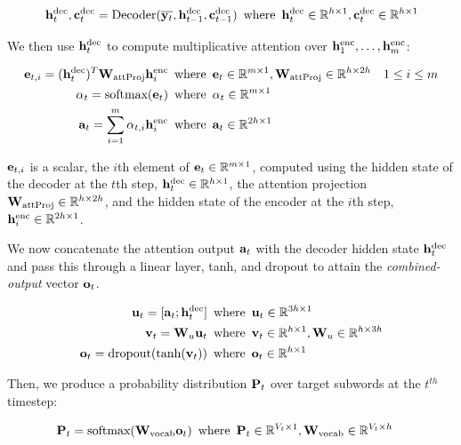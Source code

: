 \begin{align}
    \mathbf{h}^{\text{dec}}_t, \mathbf{c}^{\text{dec}}_t = \text{Decoder}(\overline{\mathbf{y}_t}, \mathbf{h}^{\text{dec}}_{t-1}, \mathbf{c}^{\text{dec}}_{t-1}) \enspace &\text{where} \enspace \mathbf{h}^{\text{dec}}_t \in \mathbb{R}^{h \times 1}, \mathbf{c}^{\text{dec}}_t \in \mathbb{R}^{h \times 1}\\
\end{align}

We then use $\mathbf{h}^{\text{dec}}_t$ to compute multiplicative attention over $\mathbf{h}^{\text{enc}}_1, \dots, \mathbf{h}^{\text{enc}}_m$:

\begin{align}
    \mathbf{e}_{t, i} = (\mathbf{h}^{\text{dec}}_t)^T\mathbf{W}_{\text{attProj}}\mathbf{h}^{\text{enc}}_i \enspace &\text{where} \enspace \mathbf{e}_{t} \in \mathbb{R}^{m \times 1}, \mathbf{W}_{\text{attProj}}\in \mathbb{R}^{h \times 2h} & 1 \le i \le m \\
    \alpha_t= \text{softmax}(\mathbf{e}_t) \enspace &\text{where} \enspace \alpha_t \in \mathbb{R}^{m \times 1}\\
    \mathbf{a}_t = \sum_{i=1}^{m}\alpha_{t,i}\mathbf{h}^{\text{enc}}_i \enspace &\text{where} \enspace \mathbf{a}_t \in \mathbb{R}^{2h \times 1}
\end{align}

$\mathbf{e}_{t, i}$ is a scalar, the $i$th element of $\mathbf{e}_{t} \in \mathbb{R}^{m \times 1}$, computed using the hidden state of the decoder at the $t$th step, $\mathbf{h}^{\text{dec}}_t \in \mathbb{R}^{h \times 1}$, the attention projection $\mathbf{W}_{\text{attProj}} \in \mathbb{R}^{h \times 2h}$, and the hidden state of the encoder at the $i$th step, $\mathbf{h}^{\text{enc}}_i \in \mathbb{R}^{2h \times 1}$.

We now concatenate the attention output $\mathbf{a}_t$ with the decoder hidden state $\mathbf{h}^{\text{dec}}_t$ and pass this through a linear layer, tanh, and dropout to attain the \textit{combined-output} vector $\mathbf{o}_{t}$.

\begin{align}
    \mathbf{u}_{t} = [\mathbf{a}_{t}; \mathbf{h}^{\text{dec}}_t] \enspace &\text{where} \enspace \mathbf{u}_t \in  \mathbb{R}^{3h \times 1} \\
    \mathbf{v}_t = \mathbf{W}_{u}\mathbf{u}_t \enspace &\text{where} \enspace \mathbf{v}_t \in \mathbb{R}^{h \times 1}, \mathbf{W}_{u} \in \mathbb{R}^{h \times 3h}\\
    \mathbf{o}_t = \text{dropout}(\text{tanh}(\mathbf{v}_t)) \enspace &\text{where} \enspace \mathbf{o}_t \in \mathbb{R}^{h \times 1}
\end{align}

Then, we produce a probability distribution $\mathbf{P}_t$ over target subwords at the $t^{th}$ timestep:

\begin{align}
    \mathbf{P}_t = \text{softmax}(\mathbf{W}_{\text{vocab}}\mathbf{o}_{t}) \enspace &\text{where} \enspace \mathbf{P}_t \in \mathbb{R}^{V_{t} \times 1}, \mathbf{W}_{\text{vocab}} \in \mathbb{R}^{V_{t} \times h}
\end{align}

